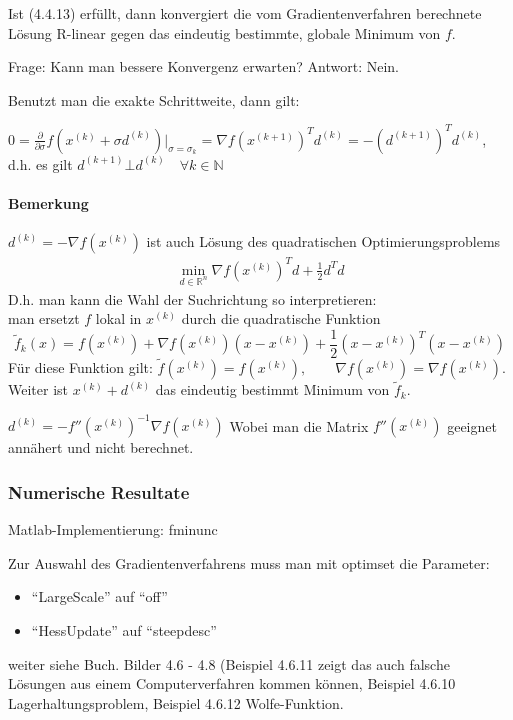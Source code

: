 \documentclass[ngerman,halfparskip]{scrartcl}
\theoremstyle{definition}
\newcommand*{\R}{\mathbb{R}}      %
\begin{document}
Ist (4.4.13) erfüllt, dann konvergiert die vom Gradientenverfahren berechnete Lösung R-linear gegen das eindeutig bestimmte, globale Minimum von $f$. 

Frage: Kann man bessere Konvergenz erwarten? Antwort: Nein.

Benutzt man die exakte Schrittweite, dann gilt:

$0=\frac\partial{\partial\sigma}f\left(x^{(k)}+\sigma d^{(k)}\right)|_{\sigma=\sigma_k}=\nabla f(x^{(k+1)})^Td^{(k)}=-(d^{(k+1)})^Td^{(k)}$, d.h. es gilt $d^{(k+1)}\bot d^{(k)} \quad \forall k\in\mathbb N$

\paragraph{Bemerkung} $d^{(k)}=-\nabla f (x^{(k)})$ ist auch Lösung des quadratischen Optimierungsproblems
\begin{gather*}\tag{Q$_k$}
\min\limits_{d\in\R^n}\nabla f(x^{(k)})^Td+\frac 12 d^Td 
\end{gather*}
D.h. man kann die Wahl der Suchrichtung so interpretieren: \\
man ersetzt $f$ lokal in $x^{(k)}$ durch die quadratische Funktion\\
$$\tilde f_k(x)=f(x^{(k)})+\nabla f (x^{(k)})(x-x^{(k)})+\frac 12 (x-x^{(k)})^T(x-x^{(k)})$$
Für diese Funktion gilt: $\tilde f (x^{(k)})=f(x^{(k)}),\qquad \nabla f(x^{(k)})=\nabla f(x^{(k)})$. Weiter ist $x^{(k)}+d^{(k)}$ das eindeutig bestimmt Minimum von $\tilde f _k$.

$d^{(k)}=-f''(x^{(k)})^{-1}\nabla f(x^{(k)})$ Wobei man die Matrix $f''(x^{(k)})$ geeignet annähert und nicht berechnet.

\subsubsection{Numerische Resultate}
Matlab-Implementierung: fminunc

Zur Auswahl des Gradientenverfahrens muss man mit optimset die Parameter:
\begin{itemize}
\item "`LargeScale"' auf "`off"'
\item "`HessUpdate"' auf "`steepdesc"'
\end{itemize}

weiter siehe Buch. Bilder 4.6 - 4.8  (Beispiel 4.6.11 zeigt das auch falsche Lösungen aus einem Computerverfahren kommen können, Beispiel 4.6.10 Lagerhaltungsproblem, Beispiel 4.6.12 Wolfe-Funktion.
\end{document}
